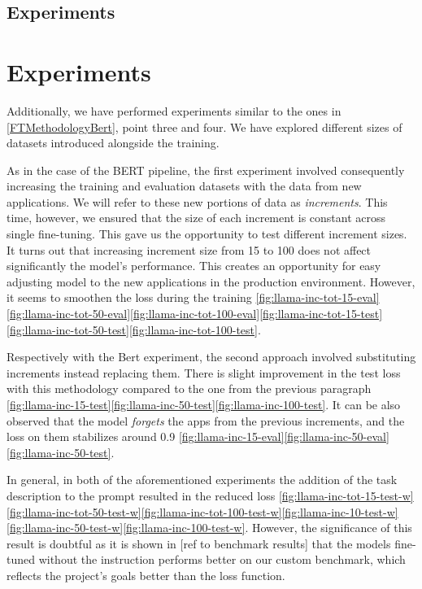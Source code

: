 \documentclass[licencjacka,en]{pracamgr}
\begin{document}
\subsection{Experiments}

\section{Experiments}
Additionally, we have performed experiments similar to the ones in \ref{FTMethodologyBert}, point three and four. We have explored different sizes of datasets introduced alongside the training.

As in the case of the BERT pipeline, the first experiment involved consequently increasing the training and evaluation datasets with the data from new applications. We will refer to these new portions of data as \emph{increments}. This time, however, we ensured that the size of each increment is constant across single fine-tuning. This gave us the opportunity to test different increment sizes. It turns out that increasing increment size from 15 to 100 does not affect significantly the model's performance. This creates an opportunity for easy adjusting model to the new applications in the production environment. However, it seems to smoothen the loss during the training \ref{fig:llama-inc-tot-15-eval}\ref{fig:llama-inc-tot-50-eval}\ref{fig:llama-inc-tot-100-eval}\ref{fig:llama-inc-tot-15-test}\ref{fig:llama-inc-tot-50-test}\ref{fig:llama-inc-tot-100-test}.

Respectively with the Bert experiment, the second approach involved substituting increments instead replacing them. There is slight improvement in the test loss with this methodology compared to the one from the previous paragraph \ref{fig:llama-inc-15-test}\ref{fig:llama-inc-50-test}\ref{fig:llama-inc-100-test}. It can be also observed that the model \emph{forgets} the apps from the previous increments, and the loss on them stabilizes around 0.9 \ref{fig:llama-inc-15-eval}\ref{fig:llama-inc-50-eval}\ref{fig:llama-inc-50-test}.

In general, in both of the aforementioned experiments the addition of the task description to the prompt resulted in the reduced loss \ref{fig:llama-inc-tot-15-test-w}\ref{fig:llama-inc-tot-50-test-w}\ref{fig:llama-inc-tot-100-test-w}\ref{fig:llama-inc-10-test-w}\ref{fig:llama-inc-50-test-w}\ref{fig:llama-inc-100-test-w}. However, the significance of this result is doubtful as it is shown in [ref to benchmark results] that the models fine-tuned without the instruction performs better on our custom benchmark, which reflects the project's goals better than the loss function.
\end{document}
